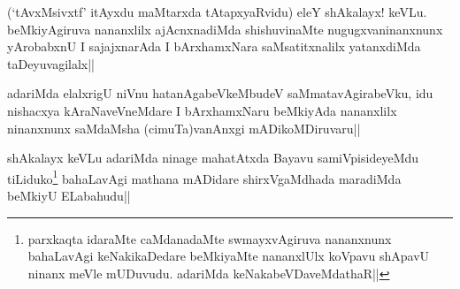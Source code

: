 \begin{artha}
(`tAvxMsivxtf' itAyxdu maMtarxda tAtapxyaRvidu) eleY shAkalayx! keVLu. beMkiyAgiruva nananxlilx ajAcnxnadiMda shishuvinaMte nugugxvaninanxnunx yArobabxnU I sajajxnarAda I bArxhamxNara saMsatitxnalilx yatanxdiMda taDeyuvagilalx||
\end{artha}

\begin{artha}
adariMda elalxrigU niVnu hatanAgabeVkeMbudeV saMmatavAgirabeVku, idu nishacxya kAraNaveVneMdare I bArxhamxNaru beMkiyAda nananxlilx ninanxnunx saMdaMsha (cimuTa)vanAnxgi mADikoMDiruvaru||
\end{artha}

\begin{artha}
shAkalayx keVLu adariMda ninage mahatAtxda Bayavu samiVpisideyeMdu tiLiduko\footnote[1]{parxkaqta idaraMte caMdanadaMte swmayxvAgiruva nananxnunx bahaLavAgi keNakikaDedare beMkiyaMte nananxlUlx koVpavu shApavU ninanx meVle mUDuvudu. adariMda keNakabeVDaveMdathaR||} bahaLavAgi mathana mADidare shirxVgaMdhada maradiMda beMkiyU ELabahudu||
\end{artha}

\begin{artha}%

\end{artha}
